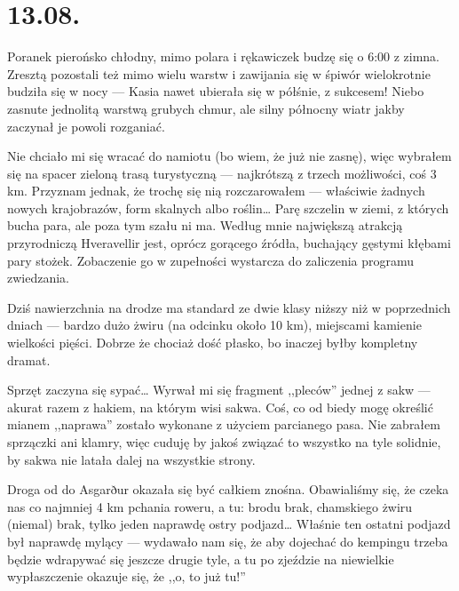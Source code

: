 \chapter*{13.08.}

Poranek pierońsko chłodny, mimo polara i rękawiczek budzę się o 6:00 z zimna. Zresztą pozostali też mimo wielu warstw i zawijania się w śpiwór wielokrotnie budziła się w nocy --- Kasia nawet ubierała się w półśnie, z sukcesem! Niebo zasnute jednolitą warstwą grubych chmur, ale silny północny wiatr jakby zaczynał je powoli rozganiać.

Nie chciało mi się wracać do namiotu (bo wiem, że już nie zasnę), więc wybrałem się na spacer zieloną trasą turystyczną --- najkrótszą z trzech możliwości, coś 3 km. Przyznam jednak, że trochę się nią rozczarowałem --- właściwie żadnych nowych krajobrazów, form skalnych albo roślin… Parę szczelin w ziemi, z których bucha para, ale poza tym szału ni ma. Według mnie największą atrakcją przyrodniczą Hveravellir jest, oprócz gorącego źródła, buchający gęstymi kłębami pary stożek. Zobaczenie go w zupełności wystarcza do zaliczenia programu zwiedzania.


Dziś nawierzchnia na drodze ma standard ze dwie klasy niższy niż w poprzednich dniach --- bardzo dużo żwiru (na odcinku około 10 km), miejscami kamienie wielkości pięści. Dobrze że chociaż dość płasko, bo inaczej byłby kompletny dramat.


Sprzęt zaczyna się sypać… Wyrwał mi się fragment ,,pleców'' jednej z sakw --- akurat razem z hakiem, na którym wisi sakwa. Coś, co od biedy mogę określić mianem ,,naprawa'' zostało wykonane z użyciem parcianego pasa. Nie zabrałem sprzączki ani klamry, więc cuduję by jakoś związać to wszystko na tyle solidnie, by sakwa nie latała dalej na wszystkie strony.

Droga od  do Asgarður okazała się być całkiem znośna. Obawialiśmy się, że czeka nas co najmniej 4 km pchania roweru, a tu: brodu brak, chamskiego żwiru (niemal) brak, tylko jeden naprawdę ostry podjazd… Właśnie ten ostatni podjazd był naprawdę mylący --- wydawało nam się, że aby dojechać do kempingu trzeba będzie wdrapywać się jeszcze drugie tyle, a tu po zjeździe na niewielkie wypłaszczenie okazuje się, że ,,o, to już tu!''

